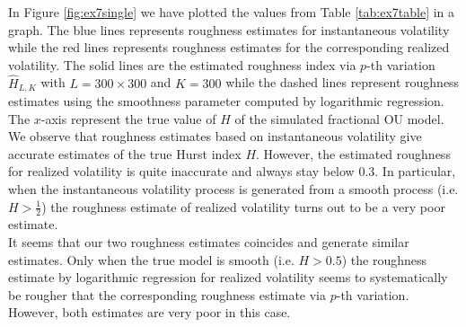 \documentclass{article}
\begin{document}
In Figure \ref{fig:ex7single} we have plotted the values from Table \ref{tab:ex7table} in a graph. The blue lines represents roughness estimates for instantaneous volatility while the red lines represents roughness estimates for the corresponding realized volatility. The solid lines are the estimated roughness index via $p$-th variation $\hat{H}_{L,K}$ with $L=300\times 300$ and $K=300$ while the dashed lines represent roughness estimates using the smoothness parameter computed by logarithmic regression. The $x$-axis represent the true value of $H$ of the simulated fractional OU model. We observe that roughness estimates based on instantaneous volatility give accurate estimates of the true Hurst index $H$. However, the estimated roughness for realized volatility is quite inaccurate and always stay below $0.3$. In particular, when the instantaneous volatility process is generated from a smooth process (i.e. $H>\frac{1}{2}$) the roughness estimate of realized volatility turns out to be a very poor estimate.\\ 
It seems that our two roughness estimates coincides and generate similar estimates. Only when the true model is smooth (i.e. $H>0.5$) the roughness estimate by logarithmic regression for realized volatility seems to systematically be rougher that the corresponding roughness estimate via $p$-th variation. However, both estimates are very poor in this case. 
\end{document}
